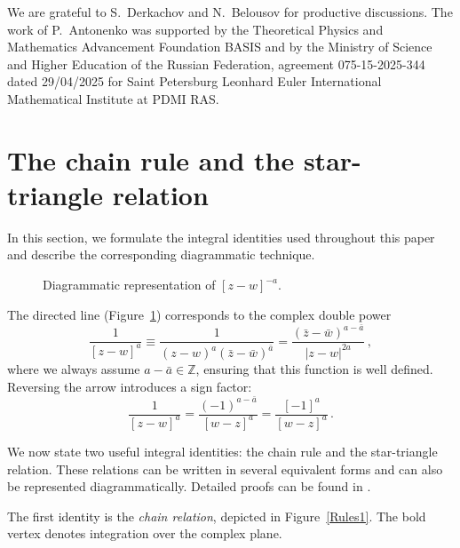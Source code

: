 \documentclass[a4paper,11pt]{article}
\numberwithin{equation}{section}
\begin{document}
We are grateful to S.~Derkachov and N.~Belousov for productive discussions.
The work of P.~Antonenko was supported by the 
Theoretical Physics and Mathematics Advancement Foundation BASIS and by the Ministry of Science and Higher Education of the Russian Federation, agreement 075-15-2025-344 dated 29/04/2025 for Saint Petersburg Leonhard Euler International Mathematical Institute at PDMI RAS.

\appendix

\section{The chain rule and the star-triangle relation}
\label{App-DiagTech}
In this section, we formulate the integral identities used throughout this paper and describe the corresponding diagrammatic technique.

\begin{figure}[H]
    \centering
    \caption{Diagrammatic representation of $[z-w]^{-a}$.}  \label{propag}
\end{figure}

The directed line (Figure~\ref{propag}) corresponds to the complex double power
\begin{equation*}
    \frac{1}{[z-w]^a} \equiv \frac{1}{(z-w)^a (\bar{z}-\bar{w})^{\bar a}} =
    \frac{(\bar{z}-\bar{w})^{a-\bar a}}{|z-w|^{2a}} \,,
\end{equation*}
where we always assume $a-\bar a \in \mathbb{Z}$, ensuring that this function is well defined.
Reversing the arrow introduces a sign factor:
\begin{equation*}
    \frac{1}{[z-w]^a} =
    \frac{(-1)^{a-\bar a}}{[w-z]^{a}} = \frac{[-1]^{a}}{[w-z]^{a}} \,.
\end{equation*}

We now state two useful integral identities: the chain rule and the star-triangle relation. These relations can be written in several equivalent forms and can also be represented diagrammatically.
Detailed proofs can be found in \cite[Appendix~A]{DKM}.

The first identity is the \textit{chain relation}, depicted in Figure~\ref{Rules1}.
The bold vertex denotes integration over the complex plane.
\end{document}
